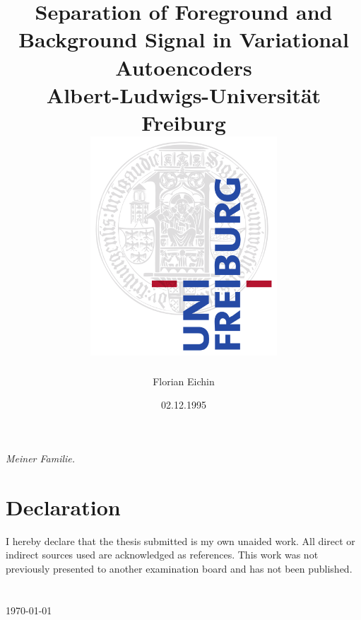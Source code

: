 \documentclass[12pt]{report}
\title{
{Separation of Foreground and Background Signal in Variational Autoencoders}\\
{\large Albert-Ludwigs-Universität Freiburg}\\[\baselineskip]
{\includegraphics[width=7cm]{logo.png}}
}
\author{Florian Eichin}
\date{02.12.1995}
\theoremstyle{definition}
\begin{document}
\maketitle

\leavevmode\thispagestyle{empty}\newpage

\begin{center}
\vspace*{\fill}
\emph{Meiner Familie.}
\vspace*{\fill}
\end{center}

\leavevmode\thispagestyle{empty}\newpage

\leavevmode\thispagestyle{empty}\newpage

\chapter*{Declaration}
I hereby declare that the thesis submitted is my own unaided work. All direct or indirect sources used are acknowledged as references. This work was not previously presented to another examination board and has not been published. \\ \\ \\

\today
\tableofcontents
\end{document}
